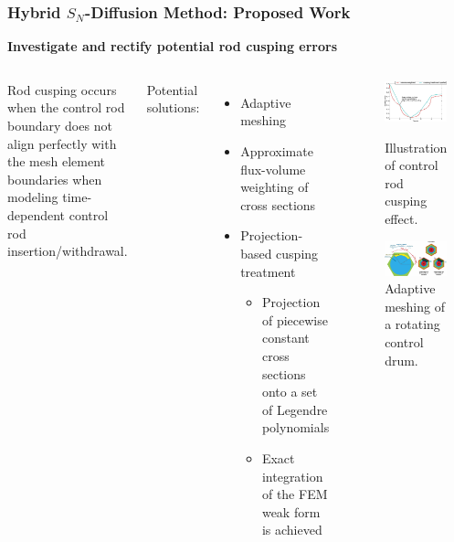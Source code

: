 \begin{frame}
  \frametitle{Hybrid $S_N$-Diffusion Method: Proposed Work}
  \textbf{Investigate and rectify potential rod cusping errors}
  \vspace{.2cm}
  \begin{columns}
    \column[t]{6.5cm}
    Rod cusping occurs when the control rod boundary does not align perfectly with the mesh element
    boundaries when modeling time-dependent control rod insertion/withdrawal.
    \vspace{.1cm}
  
    Potential solutions:
    \begin{itemize}
      \item Adaptive meshing
      \item Approximate flux-volume weighting of cross sections
      \item Projection-based cusping treatment \cite{schunert_control_2019}
      \begin{itemize}
        \item Projection of piecewise constant cross sections onto a set of Legendre polynomials
        \item Exact integration of the FEM weak form is achieved
      \end{itemize}
    \end{itemize}
    \column[t]{5.5cm}
    \begin{figure}
      \centering
      \includegraphics[width=.65\columnwidth]{images/cusping}
      \caption{Illustration of control rod cusping effect.}
      \includegraphics[width=.65\columnwidth]{images/control-drum}
      \caption{Adaptive meshing of a rotating control drum.}
    \end{figure}
  \end{columns}
\end{frame}

